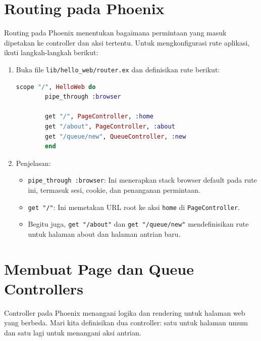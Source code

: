 \section{Routing pada Phoenix}
Routing pada Phoenix menentukan bagaimana permintaan yang masuk dipetakan ke controller dan aksi tertentu. Untuk mengkonfigurasi rute aplikasi, ikuti langkah-langkah berikut:

\begin{enumerate}
	\item Buka file \texttt{lib/hello\_web/router.ex} dan definisikan rute berikut:
	\begin{lstlisting}[language=Elixir]
		scope "/", HelloWeb do
		pipe_through :browser
		
		get "/", PageController, :home
		get "/about", PageController, :about
		get "/queue/new", QueueController, :new
		end
	\end{lstlisting}
	
	\item Penjelasan:
	\begin{itemize}
		\item \texttt{pipe\_through :browser}: Ini menerapkan stack browser default pada rute ini, termasuk sesi, cookie, dan penanganan permintaan.
		\item \texttt{get "/"}: Ini memetakan URL root ke aksi \texttt{home} di \texttt{PageController}.
		\item Begitu juga, \texttt{get "/about"} dan \texttt{get "/queue/new"} mendefinisikan rute untuk halaman about dan halaman antrian baru.
	\end{itemize}
\end{enumerate}

\section{Membuat Page dan Queue Controllers}
Controller pada Phoenix menangani logika dan rendering untuk halaman web yang berbeda. Mari kita definisikan dua controller: satu untuk halaman umum dan satu lagi untuk menangani aksi antrian.

